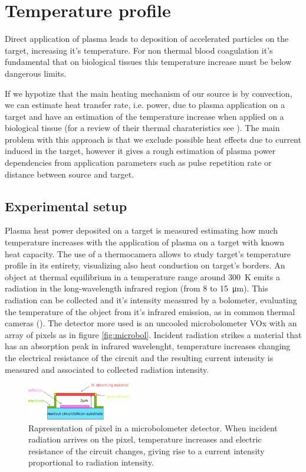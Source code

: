 \chapter{Temperature profile}
Direct application of plasma leads to deposition of accelerated particles on the target, increasing it's temperature. For non thermal blood coagulation it's fundamental that on biological tissues this temperature increase must be below dangerous limits.

If we hypotize that the main heating mechanism of our source is by convection, we can estimate heat transfer rate, i.e. power, due to plasma application on a target and have an estimation of the temperature increase when applied on a biological tissue (for a review of their thermal charateristics see \cite{biotissues}). The main problem with this approach is that we exclude possible heat effects due to current induced in the target, however it gives a rough estimation of plasma power dependencies from application parameters such as pulse repetition rate or distance between source and target.

\section{Experimental setup}
Plasma heat power deposited on a target is measured estimating how much temperature increases with the application of plasma on a target with known heat capacity. The use of a thermocamera allows to study target's temperature profile in its entirety, visualizing also heat conduction on target's borders.
An object at thermal equilibrium in a temperature range around \SI{300}{\kelvin} emits a radiation in the long-wavelength infrared region (from \num{8} to \SI{15}{\micro\meter}). This radiation can be collected and it's intensity measured by a bolometer, evaluating the temperature of the object from it's infrared emission, as in common thermal cameras (\cite{Gade2014}). The detector more used is an uncooled microbolometer VOx with an array of pixels as in figure \ref{fig:microbol}. Incident radiation strikes a material that has an absorption peak in infrared wavelenght, temperature increases changing the electrical resistance of the circuit and the resulting current intensity is measured and associated to collected radiation intensity.
\begin{figure}
 \centering
 \includegraphics[width=0.4\textwidth]{Images/Temperature/Microbolometer.png}
 \caption{Rapresentation of pixel in a microbolometer detector. When incident radiation arrives on the pixel, temperature increases and electric resistance of the circuit changes, giving rise to a current intensity proportional to radiation intensity.}
\end{figure}


